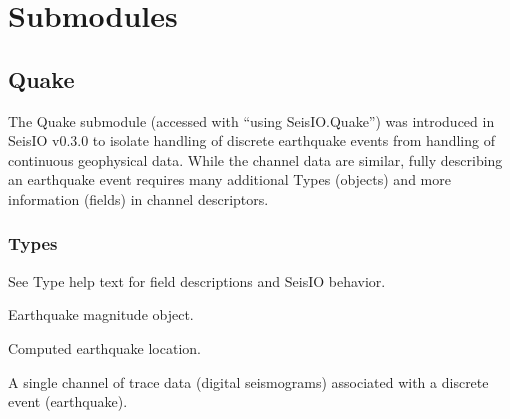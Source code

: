 \documentclass[letterpaper,11pt,english]{sphinxmanual}
\begin{document}
\chapter{Submodules}
\label{\detokenize{index:submodules}}

\section{Quake}
\label{\detokenize{src/Submodules/quake:quake}}\label{\detokenize{src/Submodules/quake::doc}}
The Quake submodule (accessed with “using SeisIO.Quake”) was introduced in
SeisIO v0.3.0 to isolate handling of discrete earthquake events from handling
of continuous geophysical data. While the channel data are similar, fully
describing an earthquake event requires many additional Types (objects) and
more information (fields) in channel descriptors.


\subsection{Types}
\label{\detokenize{src/Submodules/quake:types}}
See Type help text for field descriptions and SeisIO behavior.

\begin{fulllineitems}
\label{\detokenize{src/Submodules/quake:EQMag}}
\end{fulllineitems}


Earthquake magnitude object.

\begin{fulllineitems}
\label{\detokenize{src/Submodules/quake:EQLoc}}
\end{fulllineitems}


Computed earthquake location.

\begin{fulllineitems}
\label{\detokenize{src/Submodules/quake:EventChannel}}
\end{fulllineitems}


A single channel of trace data (digital seismograms) associated with a
discrete event (earthquake).
\end{document}
